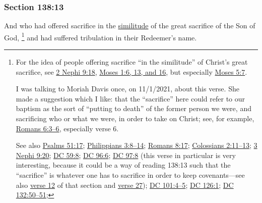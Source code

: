 
	\subsubsection{Section 138:13} %
		\label{DC138-13}

		And who had offered sacrifice in the \hyperref[SIMILITUDE]{similitude} of the great sacrifice of the Son of God,%
			\footnote{%
				\label{DC138-13-sacrifice}%
				For the idea of people offering sacrifice ``in the similitude'' of Christ's great sacrifice, see \hyperref[2NEPHI-9-18]{2 Nephi 9:18}, \hyperref[MOSES-1-6]{Moses 1:6, 13, and 16}, but especially \hyperref[MOSES-5-7]{Moses 5:7}.
				
				I was talking to Moriah Davis once, on 11/1/2021, about this verse. She made a suggestion which I like: that the ``sacrifice'' here could refer to our baptism as the sort of ``putting to death'' of the former person we were, and sacrificing who or what we were, in order to take on Christ; see, for example, \hyperref[ROMANS-6-3]{Romans 6:3--6}, especially verse 6.
				
				See also \hyperref[PSALMS-51-17]{Psalms 51:17}; \hyperref[PHILIPPIANS-3-8]{Philippians 3:8--14}; \hyperref[ROMANS-8-17]{Romans 8:17}; \hyperref[COLOSSIANS-2-11]{Colossians 2:11--13}; \hyperref[3NEPHI-9-20]{3 Nephi 9:20}; \hyperref[DC59-8]{DC 59:8}; \hyperref[DC96-6]{DC 96:6}; \hyperref[DC97-8]{DC 97:8} (this verse in particular is very interesting, because it could be a way of reading 138:13 such that the ``sacrifice'' is whatever one has to sacrifice in order to keep covenants---see also \hyperref[DC97-12]{verse 12} of that section and \hyperref[DC97-27]{verse 27}); \hyperref[DC101-4]{DC 101:4--5}; \hyperref[DC126-1]{DC 126:1}; \hyperref[DC132-50]{DC 132:50--51}; 
				}
		and had suffered tribulation in their Redeemer's name.


